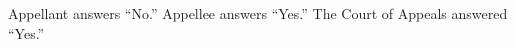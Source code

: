 \documentclass[12pt,\documentclassflag]{michiganCourtOfAppealsBrief}
\begin{document}
\noindent Appellant answers ``No.'' Appellee answers ``Yes.'' The Court of Appeals answered ``Yes.''

















\newpage
\pagestyle{plain}
\end{document}

